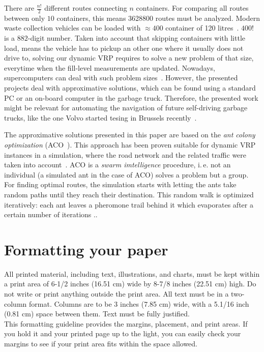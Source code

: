 \documentclass[10pt]{article}
\begin{document}
There are $\frac{n!}{2}$ different routes connecting $n$ containers. 
For comparing all routes between only $10$ containers, this means 
3628800 routes must be analyzed. Modern waste collection
vehicles can be loaded with $\approx 400$ container of 120 
litres~\cite{hyundai18}.
$400!$ is a $882$-digit number. Taken into account that skipping 
containers with little load, means the vehicle has to pickup an other
one where it usually does not drive to, solving our dynamic VRP requires
to solve a new problem of that size, everytime when the fill-level
measurements are updated. Nowadays, supercomputers can deal with 
such problem sizes~\cite{Burkhovetskiy2017}. However, the
presented projects deal with approximative solutions, which
can be found using a standard PC or an on-board computer in
the garbage truck. Therefore, the presented work might be relevant 
for automating the navigation of future self-driving garbage 
trucks, like the one Volvo started tesing in Brussels 
recently~\cite{volvo17}.

The approximative solutions presented in this paper are based on 
the {\it ant colony optimization} (ACO~\cite{Dorigo04}). This 
approach has been proven suitable for dynamic VRP instances
in a simulation, where the road network and the related 
traffic were taken into account~\cite{Karadimas2008}. ACO is a {\it swarm imtelligence}
procedure, i.\,e. not an individual (a simulated ant in the case of 
ACO) solves a problem but a group. For finding optimal routes,
the simulation starts with letting the ants take random paths
until they reach their destination. This random walk is optimized
iteratively: each ant leaves a pheromone trail behind it which
evaporates after a certain number of iterations ..


\section{Formatting your paper}

All printed material, including text, illustrations, and charts, must be kept within a print area of 6-1/2 inches (16.51 cm) wide by 8-7/8 inches (22.51 cm) high. Do not write or print anything outside the print area. All text must be in a two-column format. Columns are to be 3 inches (7.85 cm) wide, with a 5.1/16 inch (0.81 cm) space between them. Text must be fully justified. \\
This formatting guideline provides the margins, placement, and print areas. If you hold it and your printed page up to the light, you can easily check your margins to see if your print area fits within the space allowed.
\end{document}

